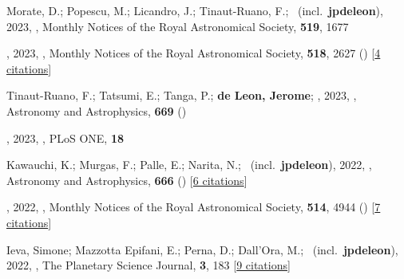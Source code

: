 \item[{\color{numcolor}\scriptsize173}] Morate, D.; Popescu, M.; Licandro, J.; Tinaut-Ruano, F.; \etal\ (incl.\ \textbf{jpdeleon}), 2023, , Monthly Notices of the Royal Astronomical Society, \textbf{519}, 1677

\item[{\color{numcolor}\scriptsize172}] , 2023, , Monthly Notices of the Royal Astronomical Society, \textbf{518}, 2627 () [\href{https://ui.adsabs.harvard.edu/abs/2023MNRAS.518.2627V}{4 citations}]

\item[{\color{numcolor}\scriptsize171}] Tinaut-Ruano, F.; Tatsumi, E.; Tanga, P.; \textbf{de Leon, Jerome}; \etal, 2023, , Astronomy and Astrophysics, \textbf{669} ()

\item[{\color{numcolor}\scriptsize170}] , 2023, , PLoS ONE, \textbf{18}

\item[{\color{numcolor}\scriptsize169}] Kawauchi, K.; Murgas, F.; Palle, E.; Narita, N.; \etal\ (incl.\ \textbf{jpdeleon}), 2022, , Astronomy and Astrophysics, \textbf{666} () [\href{https://ui.adsabs.harvard.edu/abs/2022A&A...666A...4K}{6 citations}]

\item[{\color{numcolor}\scriptsize168}] , 2022, , Monthly Notices of the Royal Astronomical Society, \textbf{514}, 4944 () [\href{https://ui.adsabs.harvard.edu/abs/2022MNRAS.514.4944C}{7 citations}]

\item[{\color{numcolor}\scriptsize167}] Ieva, Simone; Mazzotta Epifani, E.; Perna, D.; Dall'Ora, M.; \etal\ (incl.\ \textbf{jpdeleon}), 2022, , The Planetary Science Journal, \textbf{3}, 183 [\href{https://ui.adsabs.harvard.edu/abs/2022PSJ.....3..183I}{9 citations}]

